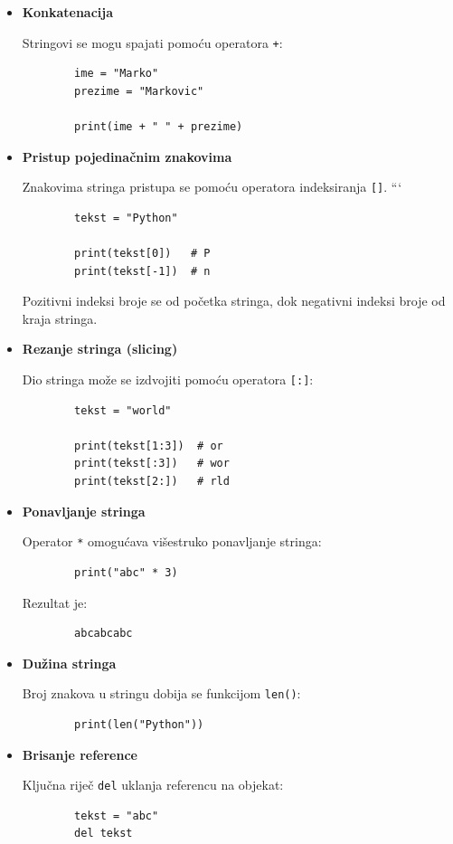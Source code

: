 \begin{itemize}
	
	\item \textbf{Konkatenacija}
	
	Stringovi se mogu spajati pomoću operatora \texttt{+}:
	
	\begin{verbatim}
		ime = "Marko"
		prezime = "Markovic"
		
		print(ime + " " + prezime)
	\end{verbatim}
	

	\item \textbf{Pristup pojedinačnim znakovima}
	
	Znakovima stringa pristupa se pomoću operatora indeksiranja \texttt{[]}.
	```
	
	\begin{verbatim}
		tekst = "Python"
		
		print(tekst[0])   # P
		print(tekst[-1])  # n
	\end{verbatim}
	
	Pozitivni indeksi broje se od početka stringa, dok negativni indeksi broje od kraja stringa.
	
	\item \textbf{Rezanje stringa (slicing)}
	
	Dio stringa može se izdvojiti pomoću operatora \texttt{[:]}:
	
	\begin{verbatim}
		tekst = "world"
		
		print(tekst[1:3])  # or
		print(tekst[:3])   # wor
		print(tekst[2:])   # rld
	\end{verbatim}
	
	\item \textbf{Ponavljanje stringa}
	
	Operator \texttt{*} omogućava višestruko ponavljanje stringa:
	
	\begin{verbatim}
		print("abc" * 3)
	\end{verbatim}
	
	Rezultat je:
	
	\begin{verbatim}
		abcabcabc
	\end{verbatim}
	\item \textbf{Dužina stringa}
	
	Broj znakova u stringu dobija se funkcijom \texttt{len()}:
	
	\begin{verbatim}
		print(len("Python"))
	\end{verbatim}
	
	\item \textbf{Brisanje reference}
	
	Ključna riječ \texttt{del} uklanja referencu na objekat:
	
	\begin{verbatim}
		tekst = "abc"
		del tekst
	\end{verbatim}
	
\end{itemize}

